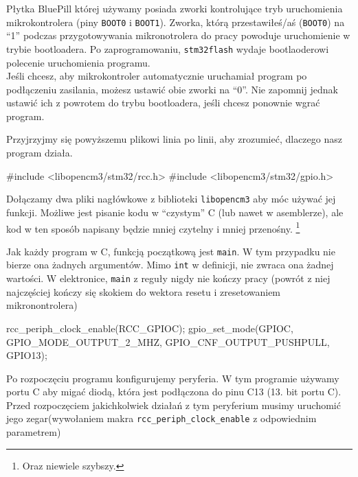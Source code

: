 \documentclass{pdfBooklets}
\begin{document}
\begin{ProTip}{}
  Płytka BluePill której używamy posiada zworki kontrolujące tryb uruchomienia mikrokontrolera (piny \Verb$BOOT0$ i \Verb$BOOT1$).
  Zworka, którą przestawiłeś/aś (\Verb$BOOT0$) na ``1'' podczas przygotowywania mikronotrolera do pracy powoduje uruchomienie w
  trybie bootloadera. Po zaprogramowaniu, \Verb$stm32flash$ wydaje bootlaoderowi polecenie uruchomienia programu.\\
  
  Jeśli chcesz, aby mikrokontroler automatycznie uruchamiał program po podłączeniu zasilania, możesz ustawić obie zworki na ``0''. Nie zapomnij
  jednak ustawić ich z powrotem do trybu bootloadera, jeśli chcesz ponownie wgrać program.
  
\end{ProTip}


Przyjrzyjmy się powyższemu plikowi linia po linii, aby zrozumieć, dlaczego nasz program działa.


\begin{CodeFrame*}[c]{}
#include <libopencm3/stm32/rcc.h>
#include <libopencm3/stm32/gpio.h>

\end{CodeFrame*}

Dołączamy dwa pliki nagłówkowe z biblioteki \Verb$libopencm3$ aby móc używać jej funkcji. Możliwe jest pisanie kodu w ``czystym'' C
(lub nawet w asemblerze), ale kod w ten sposób napisany będzie mniej czytelny i mniej przenośny.
\footnote{Oraz niewiele szybszy.}

\begin{CodeFrame*}[c]{}
int main() { 
\end{CodeFrame*}

Jak każdy program w C, funkcją początkową jest \verb$main$. W tym przypadku nie bierze ona żadnych argumentów. Mimo \Verb$int$ w
definicji, nie zwraca ona żadnej wartości. W elektronice, \Verb$main$ z reguły nigdy nie kończy pracy (powrót z niej najczęściej
kończy się skokiem do wektora resetu i zresetowaniem mikronontrolera)

\begin{CodeFrame*}[c]{}
  rcc_periph_clock_enable(RCC_GPIOC);
  gpio_set_mode(GPIOC, GPIO_MODE_OUTPUT_2_MHZ,
		GPIO_CNF_OUTPUT_PUSHPULL, GPIO13);
\end{CodeFrame*}

Po rozpoczęciu programu konfigurujemy peryferia. W tym programie używamy portu C aby migać diodą, która jest podłączona do pinu C13
(13. bit portu C). Przed rozpoczęciem jakichkolwiek działań z tym peryferium musimy uruchomić jego zegar\footnotemark (wywołaniem makra
\Verb$rcc_periph_clock_enable$ z odpowiednim parametrem)
\end{document}

